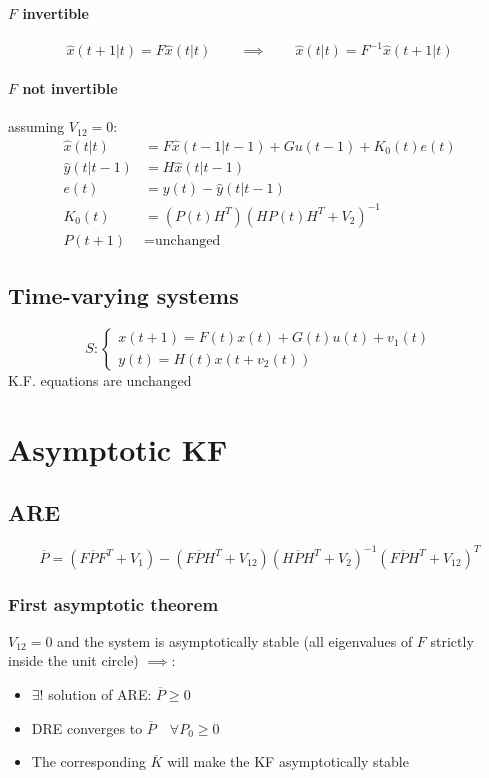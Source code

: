 \documentclass{report}
\begin{document}
\paragraph{$F$ invertible}
\[
\hat{x}(t+1|t)=F\hat{x}(t|t)
\qquad\implies\qquad
\hat{x}(t|t)=F^{-1}\hat{x}(t+1|t)
\]
\paragraph{$F$ not invertible} assuming $V_{12}=0$:
\begin{align*}
\hat{x}(t|t)&=F\hat{x}(t-1|t-1)+Gu(t-1)+K_0(t)e(t)\\
\hat{y}(t|t-1)&=H\hat{x}(t|t-1)\\
e(t)&=y(t)-\hat{y}(t|t-1)\\
K_0(t)&=\left(P(t)H^T\right)\left(HP(t)H^T+V_2\right)^{-1}\\
P(t+1)&=\text{unchanged }
\end{align*}
\subsection{Time-varying systems}
\[
S:\begin{cases}
x(t+1)=F(t)x(t)+G(t)u(t)+v_1(t)\\
y(t)=H(t)x(t+v_2(t))
\end{cases}
\]
K.F. equations are unchanged
\section{Asymptotic KF}
\subsection{ARE}
\[
\overline{P}=
\left(
F\overline{P}F^T+V_1
\right)-\left(
F\overline{P}H^T+V_{12}
\right)\left(
H\overline{P}H^T+V_2
\right)^{-1}\left(
F\overline{P}H^T+V_{12}
\right)^T
\]
\subsubsection{First asymptotic theorem}
$V_{12}=0$ and the system is asymptotically stable (all eigenvalues of $F$ strictly inside the unit circle) $\implies$:
\begin{itemize}
\item $\exists!$ solution of ARE: $\overline{P}\geq 0$
\item DRE converges to $\overline{P}\quad\forall P_0\geq 0$
\item The corresponding $\overline{K}$ will make the KF asymptotically stable
\end{itemize}
\end{document}
